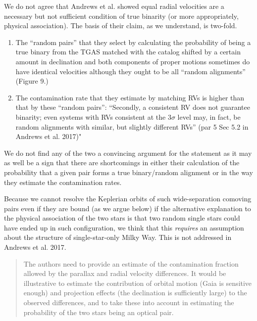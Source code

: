 \documentclass[12pt]{article}
\begin{document}
We do not agree that Andrews et al. showed equal radial velocities are a
necessary but not sufficient condition of true binarity (or more
appropriately, physical association). The basis of their claim, as we
understand, is two-fold.

\begin{enumerate}
\def\labelenumi{\arabic{enumi}.}
\itemsep1pt\parskip0pt
\item
  The ``random pairs'' that they select by calculating the
  probability of being a true binary from the TGAS matched with the
  catalog shifted by a certain amount in declination and both components
  of proper motions sometimes do have identical velocities although they
  ought to be all ``random alignments'' (Figure 9.)
\item
  The contamination rate that they estimate by matching RVs is higher
  than that by these ``random pairs'': ``Secondly, a consistent RV does
  not guarantee binarity; even systems with RVs consistent at the
  $3\sigma$ level may, in fact, be random alignments with similar, but
  slightly different RVs'' (par 5 Sec 5.2 in Andrews et al. 2017)"
\end{enumerate}

We do not find any of the two a convincing argument for the statement
as it may as well be a sign that there are shortcomings in
either their calculation of the probability that a given pair forms a true
binary/random alignment or in the way they estimate the contamination
rates.

Because we cannot resolve the Keplerian orbits of such wide-separation comoving
pairs even if they are bound (as we argue below) if the alternative explanation
to the physical association of the two stars is that two random single stars
could have ended up in such configuration, we think that this \emph{requires} an
assumption about the structure of single-star-only Milky Way. This is not
addressed in Andrews et al. 2017.


\begin{quote}
The authors need to provide an estimate of the contamination fraction
allowed by the parallax and radial velocity differences. It would be
illustrative to estimate the contribution of orbital motion (Gaia is
sensitive enough) and projection effects (the declination is
sufficiently large) to the observed differences, and to take these into
account in estimating the probability of the two stars being an optical
pair.
\end{quote}
\end{document}
